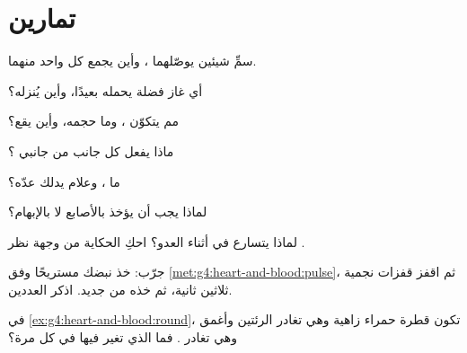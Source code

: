 \section{تمارين}

\begin{exercise}[$\star$]\label{exo:g4:heart-and-blood:1}
سمِّ شيئين يوصّلهما ، وأين يجمع كل واحد منهما.
\end{exercise}

\begin{exercise}[$\star$]\label{exo:g4:heart-and-blood:2}
أي غاز فضلة يحمله  بعيدًا، وأين يُنزله؟
\end{exercise}

\begin{exercise}[$\star$]\label{exo:g4:heart-and-blood:3}
مم يتكوّن ، وما حجمه، وأين يقع؟
\end{exercise}

\begin{exercise}[$\star$]\label{exo:g4:heart-and-blood:4}
ماذا يفعل كل جانب من جانبي ؟
\end{exercise}

\begin{exercise}[$\star$]\label{exo:g4:heart-and-blood:5}
ما ، وعلام يدلك عدّه؟
\end{exercise}

\begin{exercise}[$\star$]\label{exo:g4:heart-and-blood:6}
لماذا يجب أن يؤخذ  بالأصابع لا بالإبهام؟
\end{exercise}

\begin{exercise}[$\star$]\label{exo:g4:heart-and-blood:7}
لماذا يتسارع  في أثناء العدو؟ احكِ الحكاية من وجهة نظر 
.
\end{exercise}

\begin{exercise}[$\star$]\label{exo:g4:heart-and-blood:8}
جرّب: خذ نبضك مستريحًا وفق \cref{met:g4:heart-and-blood:pulse}، ثم
اقفز قفزات نجمية ثلاثين ثانية، ثم خذه من جديد. اذكر العددين.
\end{exercise}

\begin{exercise}[$\star\star$]\label{exo:g4:heart-and-blood:9}
في \cref{ex:g4:heart-and-blood:round}، تكون قطرة  حمراء زاهية
وهي تغادر الرئتين وأغمق وهي تغادر  . فما الذي تغير فيها
في كل مرة؟
\end{exercise}

